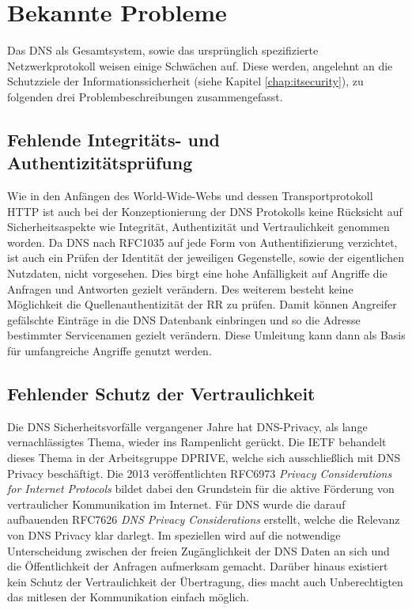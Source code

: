 \chapter{Bekannte Probleme}
\label{chap:threads}

Das DNS als Gesamtsystem, sowie das ursprünglich spezifizierte Netzwerkprotokoll weisen einige Schwächen auf. Diese werden, angelehnt an die Schutzziele der Informationssicherheit (siehe Kapitel \ref{chap:itsecurity}), zu folgenden drei Problembeschreibungen zusammengefasst.   

\section{Fehlende Integritäts- und Authentizitätsprüfung}
\label{sec:thread-auth}

Wie in den Anfängen des World-Wide-Webs und dessen Transportprotokoll HTTP ist auch bei der Konzeptionierung der DNS Protokolls keine Rücksicht auf Sicherheitsaspekte wie Integrität, Authentizität und Vertraulichkeit genommen worden. Da DNS nach RFC1035\cite{rfc1035} auf jede Form von Authentifizierung verzichtet, ist auch ein Prüfen der Identität der jeweiligen Gegenstelle, sowie der eigentlichen Nutzdaten, nicht vorgesehen. Dies birgt eine hohe Anfälligkeit auf Angriffe die Anfragen und Antworten gezielt verändern. Des weiterem besteht keine Möglichkeit die Quellenauthentizität der RR zu prüfen. Damit können Angreifer gefälschte Einträge in die DNS Datenbank einbringen und so die Adresse bestimmter Servicenamen gezielt verändern. Diese Umleitung kann dann als Basis für umfangreiche Angriffe genutzt werden.

\section{Fehlender Schutz der Vertraulichkeit}
\label{sec:thread-priv}

Die DNS Sicherheitsvorfälle vergangener Jahre hat DNS-Privacy, als lange vernachlässigtes Thema, wieder ins Rampenlicht gerückt\cite{Greenwald2013}\cite{turkybbc2017}\cite{turkywp2018}. Die \ac{IETF} behandelt dieses Thema in der Arbeitsgruppe DPRIVE, welche sich ausschließlich mit DNS Privacy beschäftigt. Die 2013 veröffentlichten RFC6973 \textit{Privacy Considerations for Internet Protocols}\cite{rfc6973} bildet dabei den Grundstein für die aktive Förderung von vertraulicher Kommunikation im Internet. Für DNS wurde die darauf aufbauenden RFC7626 \textit{DNS Privacy Considerations}\cite{rfc7626} erstellt, welche die Relevanz von DNS Privacy klar darlegt. Im speziellen wird auf die notwendige Unterscheidung zwischen der freien Zugänglichkeit der DNS Daten an sich und die Öffentlichkeit der Anfragen aufmerksam gemacht. Darüber hinaus existiert kein Schutz der Vertraulichkeit der Übertragung, dies macht auch Unberechtigten das mitlesen der Kommunikation einfach möglich.

